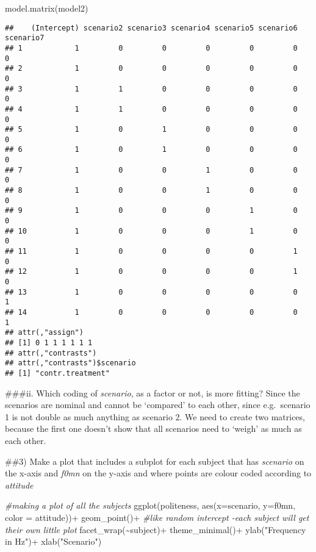 \documentclass[
]{article}
\newenvironment{Shaded}{\begin{snugshade}}{\end{snugshade}}
\newcommand{\AttributeTok}[1]{\textcolor[rgb]{0.77,0.63,0.00}{#1}}
\newcommand{\CommentTok}[1]{\textcolor[rgb]{0.56,0.35,0.01}{\textit{#1}}}
\newcommand{\FunctionTok}[1]{\textcolor[rgb]{0.00,0.00,0.00}{#1}}
\newcommand{\NormalTok}[1]{#1}
\newcommand{\SpecialCharTok}[1]{\textcolor[rgb]{0.00,0.00,0.00}{#1}}
\newcommand{\StringTok}[1]{\textcolor[rgb]{0.31,0.60,0.02}{#1}}
\begin{document}
\begin{Shaded}
\begin{Highlighting}[]
\FunctionTok{model.matrix}\NormalTok{(model2)}
\end{Highlighting}
\end{Shaded}

\begin{verbatim}
##    (Intercept) scenario2 scenario3 scenario4 scenario5 scenario6 scenario7
## 1            1         0         0         0         0         0         0
## 2            1         0         0         0         0         0         0
## 3            1         1         0         0         0         0         0
## 4            1         1         0         0         0         0         0
## 5            1         0         1         0         0         0         0
## 6            1         0         1         0         0         0         0
## 7            1         0         0         1         0         0         0
## 8            1         0         0         1         0         0         0
## 9            1         0         0         0         1         0         0
## 10           1         0         0         0         1         0         0
## 11           1         0         0         0         0         1         0
## 12           1         0         0         0         0         1         0
## 13           1         0         0         0         0         0         1
## 14           1         0         0         0         0         0         1
## attr(,"assign")
## [1] 0 1 1 1 1 1 1
## attr(,"contrasts")
## attr(,"contrasts")$scenario
## [1] "contr.treatment"
\end{verbatim}

\#\#\#ii. Which coding of \emph{scenario}, as a factor or not, is more
fitting? Since the scenarios are nominal and cannot be `compared' to
each other, since e.g.~scenario 1 is not double as much anything as
scenario 2. We need to create two matrices, because the first one
doesn't show that all scenarios need to `weigh' as much as each other.

\#\#3) Make a plot that includes a subplot for each subject that has
\emph{scenario} on the x-axis and \emph{f0mn} on the y-axis and where
points are colour coded according to \emph{attitude}

\begin{Shaded}
\begin{Highlighting}[]
\CommentTok{\#making a plot of all the subjects }
\FunctionTok{ggplot}\NormalTok{(politeness, }\FunctionTok{aes}\NormalTok{(}\AttributeTok{x=}\NormalTok{scenario, }\AttributeTok{y=}\NormalTok{f0mn, }\AttributeTok{color =}\NormalTok{ attitude))}\SpecialCharTok{+}
  \FunctionTok{geom\_point}\NormalTok{()}\SpecialCharTok{+}
\CommentTok{\#like random intercept {-}each subject will get their own little plot}
  \FunctionTok{facet\_wrap}\NormalTok{(}\SpecialCharTok{\textasciitilde{}}\NormalTok{subject)}\SpecialCharTok{+}
  \FunctionTok{theme\_minimal}\NormalTok{()}\SpecialCharTok{+}
  \FunctionTok{ylab}\NormalTok{(}\StringTok{"Frequency in Hz"}\NormalTok{)}\SpecialCharTok{+}
  \FunctionTok{xlab}\NormalTok{(}\StringTok{"Scenario"}\NormalTok{)}
\end{Highlighting}
\end{Shaded}
\end{document}

